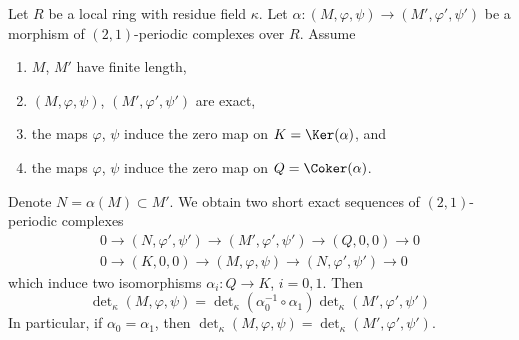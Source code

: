 %
\begin{lemma}
\label{lemma-tricky}
Let $R$ be a local ring with residue field $\kappa$.
Let $\alpha : (M, \varphi, \psi) \to (M', \varphi', \psi')$
be a morphism of $(2, 1)$-periodic complexes over $R$.
Assume
\begin{enumerate}
\item $M$, $M'$ have finite length,
\item $(M, \varphi, \psi)$, $(M', \varphi', \psi')$ are exact,
\item the maps $\varphi$, $\psi$ induce the zero map on
$K = \Ker(\alpha)$, and
\item the maps $\varphi$, $\psi$ induce the zero map on
$Q = \Coker(\alpha)$.
\end{enumerate}
Denote $N = \alpha(M) \subset M'$. We obtain two short exact sequences
of $(2, 1)$-periodic complexes
$$
\begin{matrix}
0 \to (N, \varphi', \psi') \to (M', \varphi', \psi') \to (Q, 0, 0) \to 0 \\
0 \to (K, 0, 0) \to (M, \varphi, \psi) \to (N, \varphi', \psi') \to 0
\end{matrix}
$$
which induce two isomorphisms $\alpha_i : Q \to K$, $i = 0, 1$. Then
$$
\det\nolimits_\kappa(M, \varphi, \psi)
=
\det\nolimits_\kappa(\alpha_0^{-1} \circ \alpha_1)
\det\nolimits_\kappa(M', \varphi', \psi')
$$
In particular, if $\alpha_0 = \alpha_1$, then
$\det\nolimits_\kappa(M, \varphi, \psi) =
\det\nolimits_\kappa(M', \varphi', \psi')$.
\end{lemma}

